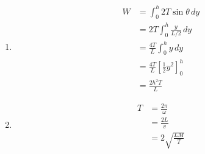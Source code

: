 \documentclass{article}
\begin{document}
\begin{enumerate}
  \item

        \begin{align*}
          W & = \int_0^h 2 T \sin \theta \,dy                    \\
            & = 2 T \int_0^h \frac{y}{L / 2} \,dy                \\
            & = \frac{4 T}{L} \int_0^h y \,dy                    \\
            & = \frac{4 T}{L} \left[ \frac{1}{2} y^2 \right]_0^h \\
            & = \frac{2 h^2 T}{L}
        \end{align*}

  \item

        \begin{align*}
          T & = \frac{2 \pi}{\omega}   \\
            & = \frac{2 L}{v}          \\
            & = 2 \sqrt{\frac{L M}{T}}
        \end{align*}
\end{enumerate}

\setcounter{subsection}{13}
\subsection{}
\end{document}
